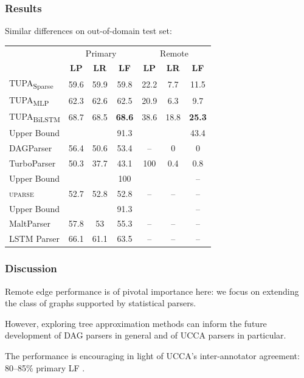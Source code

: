 \documentclass[t]{beamer}
\newcommand{\parser}[1]{TUPA\textsubscript{#1}}
\begin{document}
\begin{frame}
\frametitle{Results}
Similar differences on out-of-domain test set:
\begin{center}
	\begin{tabular}{l|ccc|ccc}
		& \multicolumn{3}{c|}{Primary} & \multicolumn{3}{c}{Remote} \\
		& \textbf{LP} & \textbf{LR} & \textbf{LF} & \textbf{LP} & \textbf{LR} & \textbf{LF} \\
		\hline
		\parser{Sparse}
		& 59.6 & 59.9 & 59.8 & 22.2 & 7.7 & 11.5 \\
		\parser{MLP}
		& 62.3 & 62.6 & 62.5 & 20.9 & 6.3 & 9.7 \\
		\parser{BiLSTM}
		& 68.7 & 68.5 & \textbf{68.6} & 38.6 & 18.8 & \textbf{25.3} \\
		\hline
		\footnotesize Upper Bound
		& & & \footnotesize 91.3 & & & \footnotesize 43.4 \\
		DAGParser
		& 56.4 & 50.6 & 53.4 & -- & 0 & 0 \\
		TurboParser
		& 50.3 & 37.7 & 43.1 & 100 & 0.4 & 0.8 \\
		\hline
		\footnotesize Upper Bound
		& & & \footnotesize 100 & & & \footnotesize -- \\
		\textsc{uparse}
		& 52.7 & 52.8 & 52.8 & -- & -- & -- \\
		\hline
		\footnotesize Upper Bound
		& & & \footnotesize 91.3 & & & \footnotesize -- \\
		MaltParser
		& 57.8 & 53 & 55.3 & -- & -- & -- \\
		LSTM Parser
		& 66.1 & 61.1 & 63.5 & -- & -- & --
	\end{tabular}
\end{center}
\end{frame}

\begin{frame}
\frametitle{Discussion}
Remote edge performance is of pivotal importance here: we focus on extending the class of graphs supported by statistical parsers.

\vfill
\pause
However, exploring tree approximation methods
can inform the future development of DAG parsers in general and of UCCA parsers in particular.

\vfill
\pause
The performance is encouraging in light of
UCCA's inter-annotator agreement: 80--85\%
primary LF \cite{abend2013universal}.
\end{frame}
\end{document}
